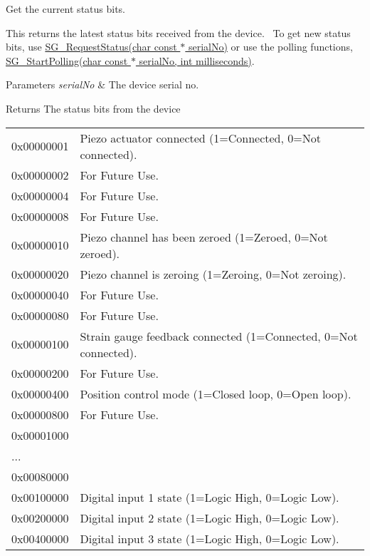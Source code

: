 Get the current status bits. 

This returns the latest status bits received from the device.~\newline
 To get new status bits, use \hyperlink{group___t_cube_strain_gauge_ga7994de6277c15126a12e82fd33a1650f}{S\+G\+\_\+\+Request\+Status(char const $\ast$ serial\+No)} or use the polling functions, \hyperlink{group___t_cube_strain_gauge_ga482455f7162dc93ed301dcb63a0fdd59}{S\+G\+\_\+\+Start\+Polling(char const $\ast$ serial\+No, int milliseconds)}. 


\begin{DoxyParams}{Parameters}
{\em serial\+No} & The device serial no. \\
\hline
\end{DoxyParams}
\begin{DoxyReturn}{Returns}
The status bits from the device \tabulinesep=1mm
\begin{longtabu} spread 0pt [c]{*2{|X[-1]}|}
\hline
0x00000001&Piezo actuator connected (1=Connected, 0=Not connected). \\
0x00000002&For Future Use. \\
0x00000004&For Future Use. \\
0x00000008&For Future Use. \\
0x00000010&Piezo channel has been zeroed (1=Zeroed, 0=Not zeroed). \\
0x00000020&Piezo channel is zeroing (1=Zeroing, 0=Not zeroing). \\
0x00000040&For Future Use. \\
0x00000080&For Future Use. \\
0x00000100&Strain gauge feedback connected (1=Connected, 0=Not connected). \\
0x00000200&For Future Use. \\
0x00000400&Position control mode (1=Closed loop, 0=Open loop). \\
0x00000800&For Future Use. \\
0x00001000&\\
...&\\
0x00080000&\\
0x00100000&Digital input 1 state (1=Logic High, 0=Logic Low). \\
0x00200000&Digital input 2 state (1=Logic High, 0=Logic Low). \\
0x00400000&Digital input 3 state (1=Logic High, 0=Logic Low). \\

\end{longtabu}
\end{DoxyReturn}
